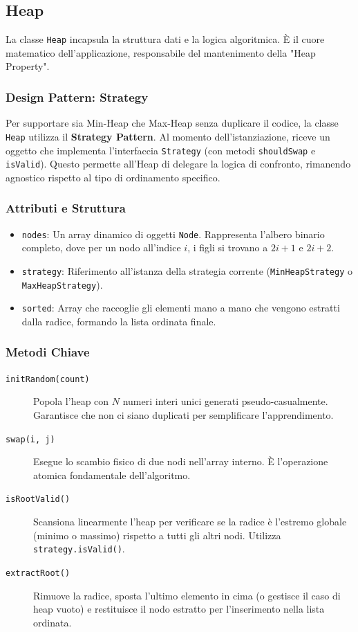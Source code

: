 \documentclass[openany]{theme/uniprthesis}
\begin{document}
\subsection{Heap}
La classe \texttt{Heap} incapsula la struttura dati e la logica algoritmica. È il cuore matematico dell'applicazione, responsabile del mantenimento della "Heap Property".

\subsubsection*{Design Pattern: Strategy}
Per supportare sia Min-Heap che Max-Heap senza duplicare il codice, la classe \texttt{Heap} utilizza il \textbf{Strategy Pattern}. Al momento dell'istanziazione, riceve un oggetto che implementa l'interfaccia \texttt{Strategy} (con metodi \texttt{shouldSwap} e \texttt{isValid}). Questo permette all'Heap di delegare la logica di confronto, rimanendo agnostico rispetto al tipo di ordinamento specifico.

\subsubsection*{Attributi e Struttura}
\begin{itemize}
    \item \texttt{nodes}: Un array dinamico di oggetti \texttt{Node}. Rappresenta l'albero binario completo, dove per un nodo all'indice $i$, i figli si trovano a $2i+1$ e $2i+2$.
    \item \texttt{strategy}: Riferimento all'istanza della strategia corrente (\texttt{MinHeapStrategy} o \texttt{MaxHeapStrategy}).
    \item \texttt{sorted}: Array che raccoglie gli elementi mano a mano che vengono estratti dalla radice, formando la lista ordinata finale.
\end{itemize}

\subsubsection*{Metodi Chiave}
\begin{description}
    \item[\texttt{initRandom(count)}] Popola l'heap con $N$ numeri interi unici generati pseudo-casualmente. Garantisce che non ci siano duplicati per semplificare l'apprendimento.
    \item[\texttt{swap(i, j)}] Esegue lo scambio fisico di due nodi nell'array interno. È l'operazione atomica fondamentale dell'algoritmo.
    \item[\texttt{isRootValid()}] Scansiona linearmente l'heap per verificare se la radice è l'estremo globale (minimo o massimo) rispetto a tutti gli altri nodi. Utilizza \texttt{strategy.isValid()}.
    \item[\texttt{extractRoot()}] Rimuove la radice, sposta l'ultimo elemento in cima (o gestisce il caso di heap vuoto) e restituisce il nodo estratto per l'inserimento nella lista ordinata.
\end{description}
\end{document}
